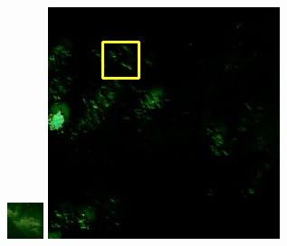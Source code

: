 \documentclass[10pt]{ctexart}
\begin{document}
\begin{multicols}{2}
\begin{figure}[H]
{\begin{minipage}[b]{0.15\linewidth}
            \includegraphics[width=1\linewidth]{../log/spoon2/cut2/tmp_cut_LC81620432014072LGN00_16237_spectral.jpg}\vspace{4pt}
            \includegraphics[width=1\linewidth]{../log/spoon2/cut2/LC81620432014072LGN00_16329_spectral.jpg}\vspace{4pt}

\end{minipage}}
\end{figure}
\end{multicols}
\end{document}
